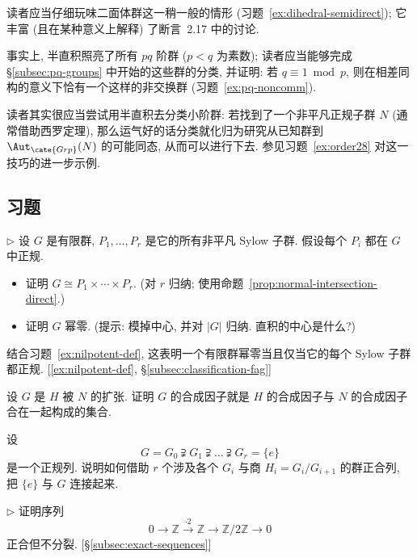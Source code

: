 读者应当仔细玩味二面体群这一稍一般的情形 (习题~\ref{ex:dihedral-semidirect}); 它丰富 (且在某种意义上解释) 了断言~2.17 中的讨论.

事实上, 半直积照亮了所有 $pq$ 阶群 ($p < q$ 为素数); 读者应当能够完成 \S\ref{subsec:pq-groups} 中开始的这些群的分类, 并证明: 若 $q \equiv 1 \bmod p$, 则在相差同构的意义下恰有一个这样的非交换群 (习题~\ref{ex:pq-noncomm}).

读者其实很应当尝试用半直积去分类小阶群: 若找到了一个非平凡正规子群 $N$ (通常借助西罗定理), 那么运气好的话分类就化归为研究从已知群到 $\Aut_{\cate{Grp}}(N)$ 的可能同态, 从而可以进行下去. 参见习题~\ref{ex:order28} 对这一技巧的进一步示例.


\subsection*{习题}
{}

\begin{prob}
\label{ex:sylow-normal-product}
$\triangleright$ 设 $G$ 是有限群, $P_1, \dots, P_r$ 是它的所有非平凡 Sylow 子群. 假设每个 $P_i$ 都在 $G$ 中正规.
\begin{itemize}
\item 证明 $G \cong P_1 \times \cdots \times P_r$. (对 $r$ 归纳; 使用命题~\ref{prop:normal-intersection-direct}.)
\item 证明 $G$ 幂零. (提示: 模掉中心, 并对 $|G|$ 归纳. 直积的中心是什么?)
\end{itemize}
结合习题~\ref{ex:nilpotent-def}, 这表明一个有限群幂零当且仅当它的每个 Sylow 子群都正规. [\ref{ex:nilpotent-def}, \S\ref{subsec:classification-fag}]
\end{prob}

\begin{prob}
\label{ex:composition-factors-extension}
设 $G$ 是 $H$ 被 $N$ 的扩张. 证明 $G$ 的合成因子就是 $H$ 的合成因子与 $N$ 的合成因子合在一起构成的集合.
\end{prob}

\begin{prob}
\label{ex:normal-series-exact}
设
\[
G = G_0 \supsetneqq G_1 \supsetneqq \dots \supsetneqq G_r = \{e\}
\]
是一个正规列. 说明如何借助 $r$ 个涉及各个 $G_i$ 与商 $H_i = G_i/G_{i+1}$ 的群正合列, 把 $\{e\}$ 与 $G$ 连接起来.
\end{prob}

\begin{prob}
\label{ex:z-split}
$\triangleright$ 证明序列
\[
0 \longrightarrow \mathbb{Z} \stackrel{\cdot 2}{\longrightarrow} \mathbb{Z} \longrightarrow \mathbb{Z}/2\mathbb{Z} \longrightarrow 0
\]
正合但不分裂. [\S\ref{subsec:exact-sequences}]
\end{prob}

